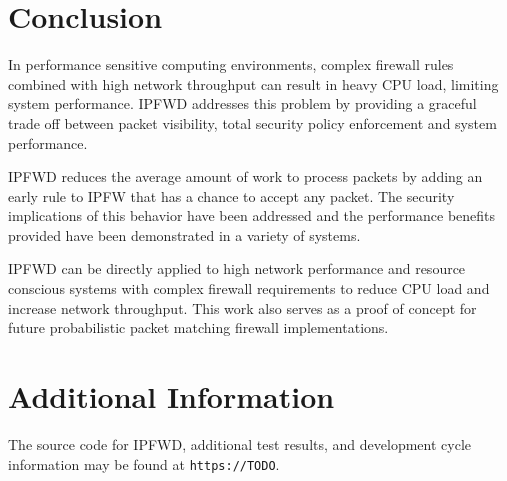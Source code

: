 \documentclass[journal]{IEEEtran}
\begin{document}
\section{Conclusion}

  In performance sensitive computing environments, complex firewall rules
  combined with high network throughput can result in heavy CPU load, limiting
  system performance. IPFWD addresses this problem by providing a graceful
  trade off between packet visibility, total security policy enforcement and
  system performance.

  IPFWD reduces the average amount of work to process packets by adding an
  early rule to IPFW that has a chance to accept any packet. The security
  implications of this behavior have been addressed and the performance
  benefits provided have been demonstrated in a variety of systems.

  IPFWD can be directly applied to high network performance and resource
  conscious systems with complex firewall requirements to reduce CPU load and
  increase network throughput. This work also serves as a proof of concept for
  future probabilistic packet matching firewall implementations.


\appendices
\section{Additional Information}
  The source code for IPFWD, additional test results, and development cycle
  information may be found at \texttt{https://TODO}.


\ifCLASSOPTIONcaptionsoff
  \newpage
\fi


\printbibliography

\end{document}
